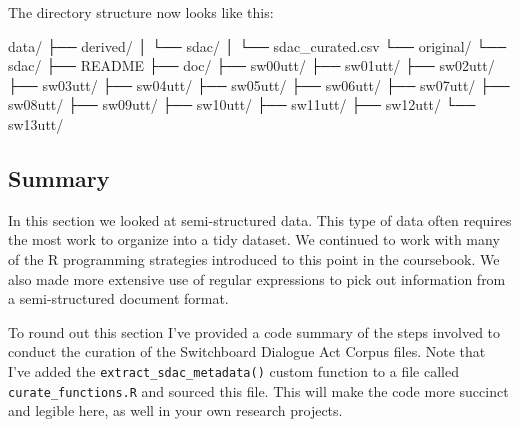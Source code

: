 \documentclass[
  letterpaper,
  DIV=11,
  numbers=noendperiod]{scrreport}
\newenvironment{Shaded}{\begin{snugshade}}{\end{snugshade}}
\newcommand{\ExtensionTok}[1]{\textcolor[rgb]{0.00,0.00,0.00}{#1}}
\newcommand{\NormalTok}[1]{\textcolor[rgb]{0.00,0.00,0.00}{#1}}
\theoremstyle{definition}
\theoremstyle{remark}
\begin{document}
The directory structure now looks like this:

\begin{Shaded}
\begin{Highlighting}[]
\ExtensionTok{data/}
\ExtensionTok{├──}\NormalTok{ derived/}
\ExtensionTok{│}\NormalTok{   └── sdac/}
\ExtensionTok{│}\NormalTok{       └── sdac\_curated.csv}
\ExtensionTok{└──}\NormalTok{ original/}
    \ExtensionTok{└──}\NormalTok{ sdac/}
        \ExtensionTok{├──}\NormalTok{ README}
        \ExtensionTok{├──}\NormalTok{ doc/}
        \ExtensionTok{├──}\NormalTok{ sw00utt/}
        \ExtensionTok{├──}\NormalTok{ sw01utt/}
        \ExtensionTok{├──}\NormalTok{ sw02utt/}
        \ExtensionTok{├──}\NormalTok{ sw03utt/}
        \ExtensionTok{├──}\NormalTok{ sw04utt/}
        \ExtensionTok{├──}\NormalTok{ sw05utt/}
        \ExtensionTok{├──}\NormalTok{ sw06utt/}
        \ExtensionTok{├──}\NormalTok{ sw07utt/}
        \ExtensionTok{├──}\NormalTok{ sw08utt/}
        \ExtensionTok{├──}\NormalTok{ sw09utt/}
        \ExtensionTok{├──}\NormalTok{ sw10utt/}
        \ExtensionTok{├──}\NormalTok{ sw11utt/}
        \ExtensionTok{├──}\NormalTok{ sw12utt/}
        \ExtensionTok{└──}\NormalTok{ sw13utt/}
\end{Highlighting}
\end{Shaded}

\hypertarget{summary-7}{%
\subsection{Summary}\label{summary-7}}

In this section we looked at semi-structured data. This type of data
often requires the most work to organize into a tidy dataset. We
continued to work with many of the R programming strategies introduced
to this point in the coursebook. We also made more extensive use of
regular expressions to pick out information from a semi-structured
document format.

To round out this section I've provided a code summary of the steps
involved to conduct the curation of the Switchboard Dialogue Act Corpus
files. Note that I've added the \texttt{extract\_sdac\_metadata()}
custom function to a file called \texttt{curate\_functions.R} and
sourced this file. This will make the code more succinct and legible
here, as well in your own research projects.
\end{document}

